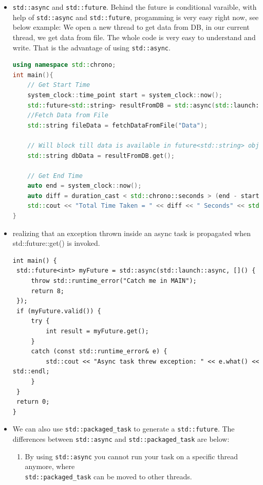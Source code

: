 \documentclass[a4paper,11pt,twoside]{book}
\begin{document}
\begin{itemize}
	\item \texttt{std::async} and \texttt{std::future}. Behind the future is conditional varaible, with help of \texttt{std::async} and \texttt{std::future}, progamming is very easy right now, see below example: We open a new thread to get data from DB, in our current thread, we get data from file. The whole code is very easy to understand and write. That is the advantage of using \texttt{std::async}.
	
\begin{lstlisting}[frame=single, language=c++]
using namespace std::chrono;
int main(){
	// Get Start Time
	system_clock::time_point start = system_clock::now();
	std::future<std::string> resultFromDB = std::async(std::launch::async, fetchDataFromDB, "Data");
	//Fetch Data from File
	std::string fileData = fetchDataFromFile("Data");
	
	// Will block till data is available in future<std::string> object.
	std::string dbData = resultFromDB.get();
	
	// Get End Time
	auto end = system_clock::now();
	auto diff = duration_cast < std::chrono::seconds > (end - start).count();
	std::cout << "Total Time Taken = " << diff << " Seconds" << std::endl;
}
\end{lstlisting}	

    \item realizing that an exception thrown inside an async task is propagated when std::future::get() is invoked.

\begin{lstlisting}[]
int main() {
 std::future<int> myFuture = std::async(std::launch::async, []() {
     throw std::runtime_error("Catch me in MAIN");
     return 8;
 });
 if (myFuture.valid()) {
     try {
         int result = myFuture.get();
     }
     catch (const std::runtime_error& e) {
         std::cout << "Async task threw exception: " << e.what() << std::endl;
     }
 }
 return 0;
}
\end{lstlisting}
\item We can also use \texttt{std::packaged\_task} to generate a \texttt{std::future}. The differences between \texttt{std::async} and \texttt{std::packaged\_task} are below:

\begin{enumerate}
	\item By using \texttt{std::async} you cannot run your task on a specific thread anymore, where \\ \texttt{std::packaged\_task} can be moved to other threads.
	

\end{enumerate}
\end{itemize}
\end{document}
